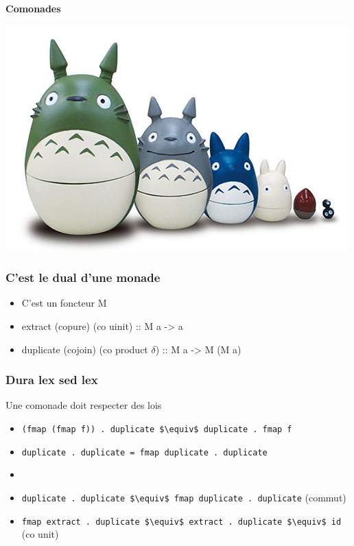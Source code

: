 \documentclass{beamer}
\begin{document}
\begin{frame}
\begin{center}
\textbf{Comonades}
\end{center}

\begin{center}
\includegraphics[scale=0.5]{comonad.jpg}
\end{center}
\end{frame}

\begin{frame}
\frametitle{C'est le dual d'une monade}

\begin{itemize}
\item C'est un foncteur M
\item extract (copure) (co uinit) :: M a -> a
\item duplicate (cojoin) (co product $\delta$) :: M a -> M (M a)
\end{itemize}
\end{frame}

\begin{frame}
\frametitle{Dura lex sed lex}
\begin{alertblock}{Une comonade doit respecter des lois}
\begin{itemize}
\item \verb!(fmap (fmap f)) . duplicate $\equiv$ duplicate . fmap f!
\item \verb!duplicate . duplicate = fmap duplicate . duplicate!
\item[] \ 
\item \verb!duplicate . duplicate $\equiv$ fmap duplicate . duplicate! (commut)
\item \verb!fmap extract . duplicate $\equiv$ extract . duplicate $\equiv$ id! (co unit)
\end{itemize}
\end{alertblock}
\end{frame}
\end{document}
